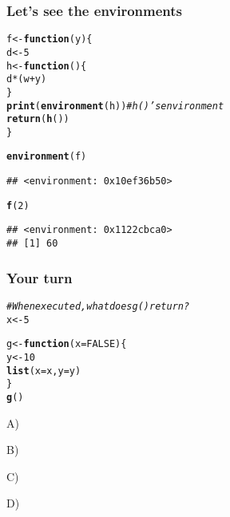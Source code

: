 \documentclass[12pt]{beamer}\usepackage[]{graphicx}\usepackage[]{color}
\makeatletter
\newcommand{\hlnum}[1]{\textcolor[rgb]{0.686,0.059,0.569}{#1}}%
\newcommand{\hlcom}[1]{\textcolor[rgb]{0.678,0.584,0.686}{\textit{#1}}}%
\newcommand{\hlopt}[1]{\textcolor[rgb]{0,0,0}{#1}}%
\newcommand{\hlstd}[1]{\textcolor[rgb]{0.345,0.345,0.345}{#1}}%
\newcommand{\hlkwa}[1]{\textcolor[rgb]{0.161,0.373,0.58}{\textbf{#1}}}%
\newcommand{\hlkwb}[1]{\textcolor[rgb]{0.69,0.353,0.396}{#1}}%
\newcommand{\hlkwc}[1]{\textcolor[rgb]{0.333,0.667,0.333}{#1}}%
\newcommand{\hlkwd}[1]{\textcolor[rgb]{0.737,0.353,0.396}{\textbf{#1}}}%
\newenvironment{kframe}{%
 \def\at@end@of@kframe{}%
 \ifinner\ifhmode%
  \def\at@end@of@kframe{\end{minipage}}%
  \begin{minipage}{\columnwidth}%
 \fi\fi%
 \def\FrameCommand##1{\hskip\@totalleftmargin \hskip-\fboxsep
 \colorbox{shadecolor}{##1}\hskip-\fboxsep
     \hskip-\linewidth \hskip-\@totalleftmargin \hskip\columnwidth}%
 \MakeFramed {\advance\hsize-\width
   \@totalleftmargin\z@ \linewidth\hsize
   \@setminipage}}%
 {\par\unskip\endMakeFramed%
 \at@end@of@kframe}
\newenvironment{knitrout}{}{} %
\makeatother
\begin{document}
\begin{frame}[fragile]
\frametitle{Let's see the environments}

\begin{knitrout}\footnotesize
{}\color{fgcolor}\begin{kframe}
\begin{alltt}
\hlstd{f} \hlkwb{<-} \hlkwa{function}\hlstd{(}\hlkwc{y}\hlstd{) \{}
  \hlstd{d} \hlkwb{<-} \hlnum{5}
  \hlstd{h} \hlkwb{<-} \hlkwa{function}\hlstd{() \{}
    \hlstd{d} \hlopt{*} \hlstd{(w} \hlopt{+} \hlstd{y)}
  \hlstd{\}}
  \hlkwd{print}\hlstd{(}\hlkwd{environment}\hlstd{(h))}   \hlcom{# h()'s environment}
  \hlkwd{return}\hlstd{(}\hlkwd{h}\hlstd{())}
\hlstd{\}}

\hlkwd{environment}\hlstd{(f)}
\end{alltt}
\begin{verbatim}
## <environment: 0x10ef36b50>
\end{verbatim}
\begin{alltt}
\hlkwd{f}\hlstd{(}\hlnum{2}\hlstd{)}
\end{alltt}
\begin{verbatim}
## <environment: 0x1122cbca0>
## [1] 60
\end{verbatim}
\end{kframe}
\end{knitrout}

\end{frame}


\begin{frame}[fragile]
\frametitle{Your turn}

\begin{knitrout}\footnotesize
{}\color{fgcolor}\begin{kframe}
\begin{alltt}
\hlcom{# When executed, what does g() return?}
\hlstd{x} \hlkwb{<-} \hlnum{5}

\hlstd{g} \hlkwb{<-} \hlkwa{function}\hlstd{(}\hlkwc{x} \hlstd{=} \hlnum{FALSE}\hlstd{) \{}
    \hlstd{y} \hlkwb{<-} \hlnum{10}
    \hlkwd{list}\hlstd{(}\hlkwc{x} \hlstd{= x,} \hlkwc{y} \hlstd{= y)}
\hlstd{\}}
\hlkwd{g}\hlstd{()}
\end{alltt}
\end{kframe}
\end{knitrout}
\bi
  \item[A)] 
  \item[B)] 
  \item[C)] 
  \item[D)] 
\ei

\end{frame}
\end{document}
